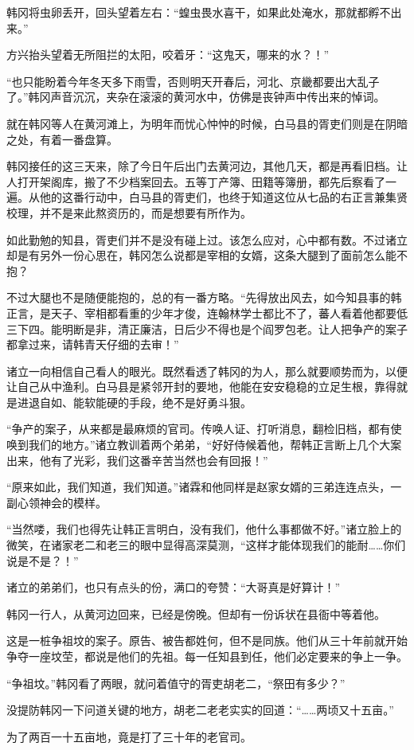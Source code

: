 韩冈将虫卵丢开，回头望着左右：“蝗虫畏水喜干，如果此处淹水，那就都孵不出来。”

方兴抬头望着无所阻拦的太阳，咬着牙：“这鬼天，哪来的水？！”

“也只能盼着今年冬天多下雨雪，否则明天开春后，河北、京畿都要出大乱子了。”韩冈声音沉沉，夹杂在滚滚的黄河水中，仿佛是丧钟声中传出来的悼词。

就在韩冈等人在黄河滩上，为明年而忧心忡忡的时候，白马县的胥吏们则是在阴暗之处，有着一番盘算。

韩冈接任的这三天来，除了今日午后出门去黄河边，其他几天，都是再看旧档。让人打开架阁库，搬了不少档案回去。五等丁产簿、田籍等簿册，都先后察看了一遍。从他的这番行动中，白马县的胥吏们，也终于知道这位从七品的右正言兼集贤校理，并不是来此熬资历的，而是想要有所作为。

如此勤勉的知县，胥吏们并不是没有碰上过。该怎么应对，心中都有数。不过诸立却是有另外一份心思在，韩冈怎么说都是宰相的女婿，这条大腿到了面前怎么能不抱？

不过大腿也不是随便能抱的，总的有一番方略。“先得放出风去，如今知县事的韩正言，是天子、宰相都看重的少年才俊，连翰林学士都比不了，蕃人看着他都要低三下四。能明断是非，清正廉洁，日后少不得也是个阎罗包老。让人把争产的案子都拿过来，请韩青天仔细的去审！”

诸立一向相信自己看人的眼光。既然看透了韩冈的为人，那么就要顺势而为，以便让自己从中渔利。白马县是紧邻开封的要地，他能在安安稳稳的立足生根，靠得就是进退自如、能软能硬的手段，绝不是好勇斗狠。

“争产的案子，从来都是最麻烦的官司。传唤人证、打听消息，翻检旧档，都有使唤到我们的地方。”诸立教训着两个弟弟，“好好侍候着他，帮韩正言断上几个大案出来，他有了光彩，我们这番辛苦当然也会有回报！”

“原来如此，我们知道，我们知道。”诸霖和他同样是赵家女婿的三弟连连点头，一副心领神会的模样。

“当然喽，我们也得先让韩正言明白，没有我们，他什么事都做不好。”诸立脸上的微笑，在诸家老二和老三的眼中显得高深莫测，“这样才能体现我们的能耐……你们说是不是？！”

诸立的弟弟们，也只有点头的份，满口的夸赞：“大哥真是好算计！”

韩冈一行人，从黄河边回来，已经是傍晚。但却有一份诉状在县衙中等着他。

这是一桩争祖坟的案子。原告、被告都姓何，但不是同族。他们从三十年前就开始争夺一座坟茔，都说是他们的先祖。每一任知县到任，他们必定要来的争上一争。

“争祖坟。”韩冈看了两眼，就问着值守的胥吏胡老二，“祭田有多少？”

没提防韩冈一下问道关键的地方，胡老二老老实实的回道：“……两顷又十五亩。”

为了两百一十五亩地，竟是打了三十年的老官司。


